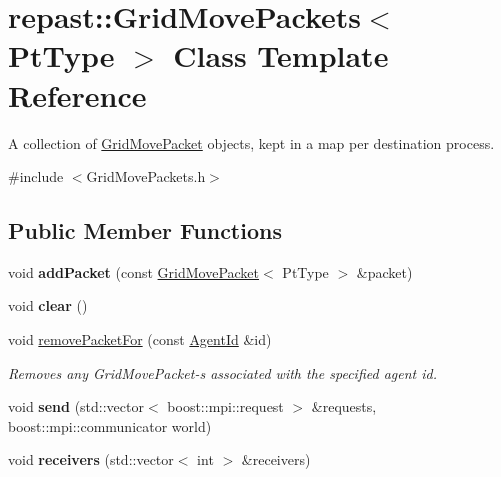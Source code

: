 \hypertarget{classrepast_1_1_grid_move_packets}{\section{repast\-:\-:Grid\-Move\-Packets$<$ Pt\-Type $>$ Class Template Reference}
\label{classrepast_1_1_grid_move_packets}
}


A collection of \hyperlink{structrepast_1_1_grid_move_packet}{Grid\-Move\-Packet} objects, kept in a map per destination process.  




{\ttfamily \#include $<$Grid\-Move\-Packets.\-h$>$}

\subsection*{Public Member Functions}
\begin{DoxyCompactItemize}
\item 
\hypertarget{classrepast_1_1_grid_move_packets_a8bc8af3fd01e9896508a70a6681c7fb2}{void {\bfseries add\-Packet} (const \hyperlink{structrepast_1_1_grid_move_packet}{Grid\-Move\-Packet}$<$ Pt\-Type $>$ \&packet)}\label{classrepast_1_1_grid_move_packets_a8bc8af3fd01e9896508a70a6681c7fb2}

\item 
\hypertarget{classrepast_1_1_grid_move_packets_a6c54ec55d5bb7145c4e76583b0f6c4df}{void {\bfseries clear} ()}\label{classrepast_1_1_grid_move_packets_a6c54ec55d5bb7145c4e76583b0f6c4df}

\item 
\hypertarget{classrepast_1_1_grid_move_packets_aabe5f41d7a3b20e17ef58423d51b8acf}{void \hyperlink{classrepast_1_1_grid_move_packets_aabe5f41d7a3b20e17ef58423d51b8acf}{remove\-Packet\-For} (const \hyperlink{classrepast_1_1_agent_id}{Agent\-Id} \&id)}\label{classrepast_1_1_grid_move_packets_aabe5f41d7a3b20e17ef58423d51b8acf}

\begin{DoxyCompactList}\small\item\em Removes any Grid\-Move\-Packet-\/s associated with the specified agent id. \end{DoxyCompactList}\item 
\hypertarget{classrepast_1_1_grid_move_packets_a87a42bb21680295cbc11f5f7dcc86b80}{void {\bfseries send} (std\-::vector$<$ boost\-::mpi\-::request $>$ \&requests, boost\-::mpi\-::communicator world)}\label{classrepast_1_1_grid_move_packets_a87a42bb21680295cbc11f5f7dcc86b80}

\item 
\hypertarget{classrepast_1_1_grid_move_packets_a42c07125961b39ee4ef64b933cb546a0}{void {\bfseries receivers} (std\-::vector$<$ int $>$ \&receivers)}\label{classrepast_1_1_grid_move_packets_a42c07125961b39ee4ef64b933cb546a0}

\end{DoxyCompactItemize}


